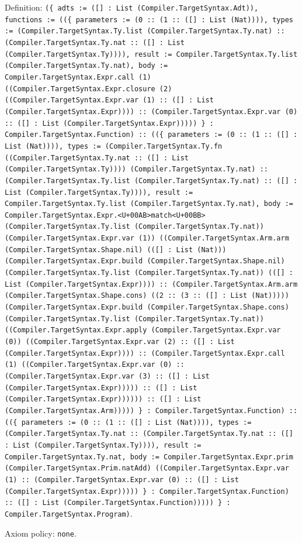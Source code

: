 \documentclass[11pt]{article}
\begin{document}
\noindent Definition: \texttt{(\{ adts := ([] : List (Compiler.TargetSyntax.Adt)), functions := ((\{ parameters := (0 :: (1 :: ([] : List (Nat)))), types := (Compiler.TargetSyntax.Ty.list (Compiler.TargetSyntax.Ty.nat) :: (Compiler.TargetSyntax.Ty.nat :: ([] : List (Compiler.TargetSyntax.Ty)))), result := Compiler.TargetSyntax.Ty.list (Compiler.TargetSyntax.Ty.nat), body := Compiler.TargetSyntax.Expr.call (1) ((Compiler.TargetSyntax.Expr.closure (2) ((Compiler.TargetSyntax.Expr.var (1) :: ([] : List (Compiler.TargetSyntax.Expr)))) :: (Compiler.TargetSyntax.Expr.var (0) :: ([] : List (Compiler.TargetSyntax.Expr))))) \} : Compiler.TargetSyntax.Function) :: ((\{ parameters := (0 :: (1 :: ([] : List (Nat)))), types := (Compiler.TargetSyntax.Ty.fn ((Compiler.TargetSyntax.Ty.nat :: ([] : List (Compiler.TargetSyntax.Ty)))) (Compiler.TargetSyntax.Ty.nat) :: (Compiler.TargetSyntax.Ty.list (Compiler.TargetSyntax.Ty.nat) :: ([] : List (Compiler.TargetSyntax.Ty)))), result := Compiler.TargetSyntax.Ty.list (Compiler.TargetSyntax.Ty.nat), body := Compiler.TargetSyntax.Expr.<U+00AB>match<U+00BB> (Compiler.TargetSyntax.Ty.list (Compiler.TargetSyntax.Ty.nat)) (Compiler.TargetSyntax.Expr.var (1)) ((Compiler.TargetSyntax.Arm.arm (Compiler.TargetSyntax.Shape.nil) (([] : List (Nat))) (Compiler.TargetSyntax.Expr.build (Compiler.TargetSyntax.Shape.nil) (Compiler.TargetSyntax.Ty.list (Compiler.TargetSyntax.Ty.nat)) (([] : List (Compiler.TargetSyntax.Expr)))) :: (Compiler.TargetSyntax.Arm.arm (Compiler.TargetSyntax.Shape.cons) ((2 :: (3 :: ([] : List (Nat))))) (Compiler.TargetSyntax.Expr.build (Compiler.TargetSyntax.Shape.cons) (Compiler.TargetSyntax.Ty.list (Compiler.TargetSyntax.Ty.nat)) ((Compiler.TargetSyntax.Expr.apply (Compiler.TargetSyntax.Expr.var (0)) ((Compiler.TargetSyntax.Expr.var (2) :: ([] : List (Compiler.TargetSyntax.Expr)))) :: (Compiler.TargetSyntax.Expr.call (1) ((Compiler.TargetSyntax.Expr.var (0) :: (Compiler.TargetSyntax.Expr.var (3) :: ([] : List (Compiler.TargetSyntax.Expr))))) :: ([] : List (Compiler.TargetSyntax.Expr)))))) :: ([] : List (Compiler.TargetSyntax.Arm))))) \} : Compiler.TargetSyntax.Function) :: ((\{ parameters := (0 :: (1 :: ([] : List (Nat)))), types := (Compiler.TargetSyntax.Ty.nat :: (Compiler.TargetSyntax.Ty.nat :: ([] : List (Compiler.TargetSyntax.Ty)))), result := Compiler.TargetSyntax.Ty.nat, body := Compiler.TargetSyntax.Expr.prim (Compiler.TargetSyntax.Prim.natAdd) ((Compiler.TargetSyntax.Expr.var (1) :: (Compiler.TargetSyntax.Expr.var (0) :: ([] : List (Compiler.TargetSyntax.Expr))))) \} : Compiler.TargetSyntax.Function) :: ([] : List (Compiler.TargetSyntax.Function))))) \} : Compiler.TargetSyntax.Program)}.\par
\noindent Axiom policy: \texttt{none}.\par
\end{document}
